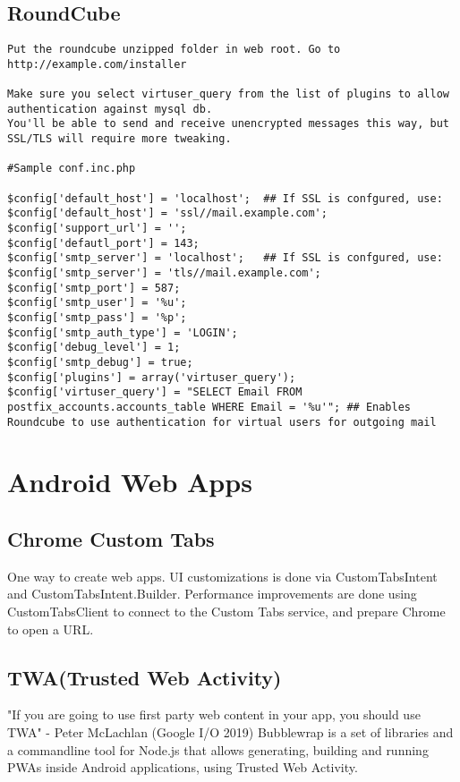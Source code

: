 \documentclass{article}
\begin{document}
\subsection{RoundCube}

\begin{verbatim}
Put the roundcube unzipped folder in web root. Go to http://example.com/installer

Make sure you select virtuser_query from the list of plugins to allow authentication against mysql db. 
You'll be able to send and receive unencrypted messages this way, but SSL/TLS will require more tweaking. 

#Sample conf.inc.php

$config['default_host'] = 'localhost';  ## If SSL is confgured, use: $config['default_host'] = 'ssl//mail.example.com';
$config['support_url'] = '';
$config['defautl_port'] = 143;
$config['smtp_server'] = 'localhost';   ## If SSL is confgured, use: $config['smtp_server'] = 'tls//mail.example.com'; 
$config['smtp_port'] = 587;
$config['smtp_user'] = '%u';
$config['smtp_pass'] = '%p';
$config['smtp_auth_type'] = 'LOGIN';
$config['debug_level'] = 1;
$config['smtp_debug'] = true;
$config['plugins'] = array('virtuser_query');                                                                    
$config['virtuser_query'] = "SELECT Email FROM postfix_accounts.accounts_table WHERE Email = '%u'"; ## Enables Roundcube to use authentication for virtual users for outgoing mail
\end{verbatim}


\section{Android Web Apps}
\subsection{Chrome Custom Tabs}
One way to create web apps. UI customizations is done via CustomTabsIntent and CustomTabsIntent.Builder. Performance improvements are done using CustomTabsClient to connect to the Custom Tabs service, and prepare Chrome to open a URL. 

\subsection{TWA(Trusted Web Activity)}
"If you are going to use first party web content in your app, you should use TWA" - Peter McLachlan (Google I/O 2019)
Bubblewrap is a set of libraries and a commandline tool for Node.js that allows generating, building and running PWAs inside Android applications, using Trusted Web Activity.
\end{document}
